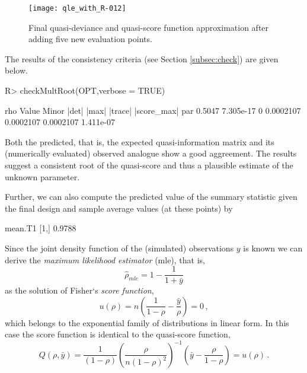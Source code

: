 \documentclass[article, nojss]{jss}
\numberwithin{equation}{section}			%
\begin{document}
%
\begin{figure}[ht!]
\centering
\texttt{[image: qle\_with\_R-012]}
\caption{Final quasi-deviance and quasi-score function approximation
after adding five new evaluation points.}
\label{fig:mm1q2}
\end{figure}
%
The results of the consistency criteria (see Section \ref{subsec:check}) are
given below.
\begin{Schunk}
\begin{Sinput}
R> checkMultRoot(OPT,verbose = TRUE)
\end{Sinput}
\begin{Soutput}
       rho     Value Minor     |det|     |max|   |trace| |score_max|
par 0.5047 7.305e-17     0 0.0002107 0.0002107 0.0002107   1.411e-07
\end{Soutput}
\end{Schunk}
Both the predicted, that is, the expected quasi-information matrix
and its (numerically evaluated) observed analogue show a good aggreement.
The results suggest a consistent root of the quasi-score and thus a plausible
estimate of the unknown parameter.\par
%
Further, we can also compute the predicted value of the summary statistic given
the final design  and sample average values  (at these
points) by
\begin{Schunk}
\begin{Soutput}
     mean.T1
[1,]  0.9788
\end{Soutput}
\end{Schunk}
%
Since the joint density function of the (simulated) observations $y$ is
known we can derive the \emph{maximum likelihood estimator} (mle), that is,
\begin{equation}\label{rhomle}
 \hat{\rho}_{mle} = 1 - \frac{1}{1+\bar{y}}
\end{equation}
as the solution of Fisher`s \emph{score function},  
\[
 u(\rho)=n\left(\frac{1}{1-\rho}-\frac{\bar{y}}{\rho}\right)=0\,,
\]
which belongs to the exponential family of distributions in linear form. In this
case the score function is identical to the quasi-score function,
\begin{equation}\label{qsmm1q}
Q(\rho,\bar{y})=\frac{1}{(1-\rho)}\left(\frac{\rho}{n(1-\rho)^2}\right)^{-1}\left(\bar{y}-\frac{\rho}{1-\rho}\right) = u(\rho)\,.
\end{equation}
\end{document}
